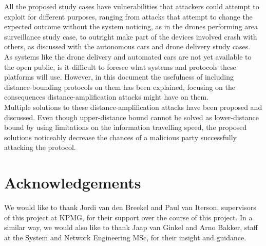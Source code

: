 \documentclass{article}
\begin{document}
All the proposed study cases have vulnerabilities that attackers could attempt to exploit for different purposes, ranging from attacks that attempt to change the expected outcome without the system noticing, as in the drones performing area surveillance study case, to outright make part of the devices involved crash with others, as discussed with the autonomous cars and drone delivery study cases.\\

As systems like the drone delivery and automated cars are not yet available to the open public, is it difficult to foresee what systems and protocols these platforms will use. However, in this document the usefulness of including distance-bounding protocols on them has been explained, focusing on the consequences distance-amplification attacks might have on them.\\

Multiple solutions to these distance-amplification attacks have been proposed and discussed. Even though upper-distance bound cannot be solved as lower-distance bound by using limitations on the information travelling speed, the proposed solutions noticeably decrease the chances of a malicious party successfully attacking the protocol.\\




















\section{Acknowledgements}
\label{sec:acknowledgements}

We would like to thank Jordi van den Breekel and Paul van Iterson, supervisors of this project at KPMG, for their support over the course of this project. In a similar way, we would also like to thank Jaap van Ginkel and Arno Bakker, staff at the System and Network Engineering MSc, for their insight and guidance.\\







\printbibliography


\end{document}
